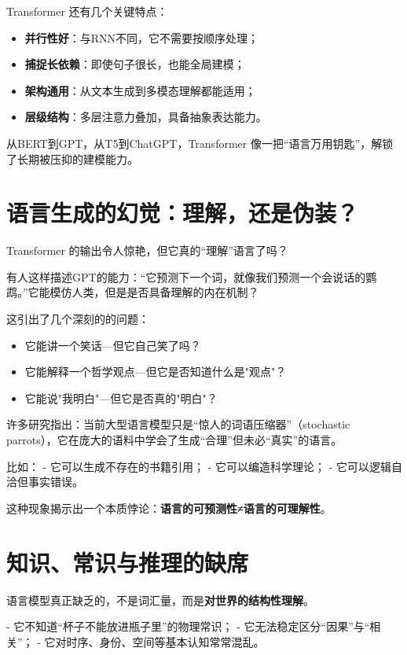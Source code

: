 Transformer 还有几个关键特点：

\begin{itemize}
\item \textbf{并行性好}：与RNN不同，它不需要按顺序处理；
\item \textbf{捕捉长依赖}：即使句子很长，也能全局建模；
\item \textbf{架构通用}：从文本生成到多模态理解都能适用；
\item \textbf{层级结构}：多层注意力叠加，具备抽象表达能力。
\end{itemize}

从BERT到GPT，从T5到ChatGPT，Transformer 像一把“语言万用钥匙”，解锁了长期被压抑的建模能力。

\section*{语言生成的幻觉：理解，还是伪装？}

Transformer 的输出令人惊艳，但它真的“理解”语言了吗？

有人这样描述GPT的能力：“它预测下一个词，就像我们预测一个会说话的鹦鹉。”它能模仿人类，但是是否具备理解的内在机制？

这引出了几个深刻的的问题：

\begin{itemize}
\item 它能讲一个笑话---但它自己笑了吗？
\item 它能解释一个哲学观点---但它是否知道什么是"观点"？
\item 它能说"我明白"---但它是否真的"明白"？
\end{itemize}

许多研究指出：当前大型语言模型只是“惊人的词语压缩器”（stochastic parrots），它在庞大的语料中学会了生成“合理”但未必“真实”的语言。

比如：
- 它可以生成不存在的书籍引用；
- 它可以编造科学理论；
- 它可以逻辑自洽但事实错误。

这种现象揭示出一个本质悖论：\textbf{语言的可预测性≠语言的可理解性}。

\section*{知识、常识与推理的缺席}

语言模型真正缺乏的，不是词汇量，而是\textbf{对世界的结构性理解}。

- 它不知道“杯子不能放进瓶子里”的物理常识；
- 它无法稳定区分“因果”与“相关”；
- 它对时序、身份、空间等基本认知常常混乱。

